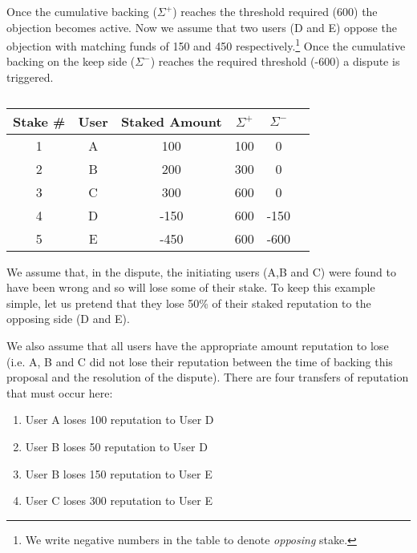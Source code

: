 Once the cumulative backing ($\Sigma^+$) reaches the threshold required (600) the objection becomes active. Now we assume that two users (D and E) oppose the objection with matching funds of 150 and 450 respectively.\footnote{We write negative numbers in the table to denote \emph{opposing} stake.} Once the cumulative backing on the keep side ($\Sigma^-$) reaches the required threshold (-600) a dispute is triggered.

\begin{table}[h]
\centering
\caption{}
\begin{tabular}{|c|c|c|c|c|c|}
\hline
Stake \# & User  & Staked Amount & $\Sigma^+$ & $\Sigma^-$ \\ \hline
1 & A & 100           & 100                      & 0                                                                       \\ \hline
2 & B & 200           & 300                      & 0                                                                       \\ \hline
3 & C & 300           & 600                      & 0                                                                       \\ \hline
4 & D & -150          & 600                      & -150                                                                    \\ \hline
5 & E & -450          & 600                      & -600                                                                    \\ \hline
\end{tabular}
\end{table}

We assume that, in the dispute, the initiating users (A,B and C) were found to have been wrong and so will lose some of their stake. To keep this example simple, let us pretend that they lose 50\% of their staked reputation to the opposing side (D and E).

We also assume that all users have the appropriate amount reputation to lose (i.e. A, B and C did not lose their reputation between the time of backing this proposal and the resolution of the dispute). There are four transfers of reputation that must occur here:

\begin{enumerate}
\item User A loses 100 reputation to User D
\item User B loses 50 reputation to User D
\item User B loses 150 reputation to User E
\item User C loses 300 reputation to User E
\end{enumerate}


